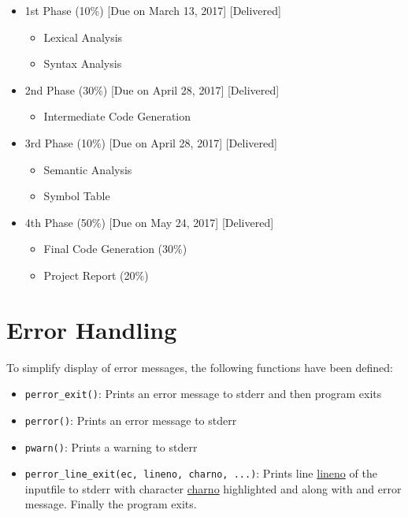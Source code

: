 \documentclass{article}
\def\code#1{\texttt{#1}} %
\begin{document}
\begin{itemize}
 \item 1st Phase (10\%) [Due on March 13, 2017] [Delivered]
 \begin{itemize}
  \item Lexical Analysis
  \item Syntax Analysis
 \end{itemize}

 \item 2nd Phase (30\%) [Due on April 28, 2017] [Delivered]
 \begin{itemize}
  \item Intermediate Code Generation
 \end{itemize}
 
 \item 3rd Phase (10\%) [Due on April 28, 2017] [Delivered]
 \begin{itemize}
  \item Semantic Analysis
  \item Symbol Table
 \end{itemize}

 \item 4th Phase (50\%) [Due on May 24, 2017] [Delivered]
 \begin{itemize}
  \item Final Code Generation (30\%)
  \item Project Report (20\%)
 \end{itemize}
\end{itemize}



\section{Error Handling}

To simplify display of error messages, the following functions have been defined:
\begin{itemize}
 \item \code{perror\_exit()}: Prints an error message to stderr and then program exits
 \item \code{perror()}: Prints an error message to stderr
 \item \code{pwarn()}: Prints a warning to stderr
 \item \code{perror\_line\_exit(ec, lineno, charno, ...)}: Prints line \underline{lineno}
       of the inputfile to stderr with character \underline{charno} highlighted and along
       with and error message. Finally the program exits.
\end{itemize}
\end{document}
